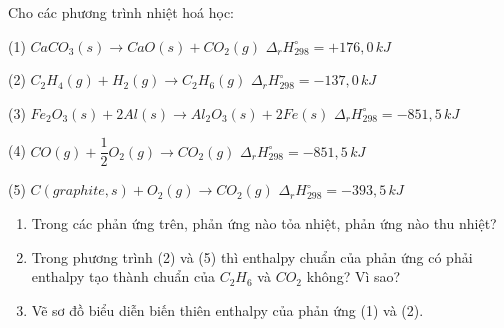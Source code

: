\documentclass[Main.tex]{subfiles}
\begin{document}
	\begin{bt}
		Cho các phương trình nhiệt hoá học:
		
		(1) $CaCO_3(s) \longrightarrow CaO(s) + CO_2(g)\,\, \Delta_r H_{298}^\circ = +176{,}0\, kJ$
		
		(2) $C_2H_4(g) + H_2(g) \longrightarrow C_2H_6(g)\,\, \Delta_r H_{298}^\circ = -137{,}0\, kJ$
		
		(3) $Fe_2O_3(s) + 2Al(s) \longrightarrow Al_2O_3(s) + 2Fe(s)\,\, \Delta_r H_{298}^\circ = -851{,}5\, kJ$
		
		(4) $CO(g) + \dfrac{1}{2}O_2(g) \longrightarrow CO_2(g)\,\, \Delta_r H_{298}^\circ = -851{,}5\, kJ$
		
		(5) $C(graphite, s) + O_2(g) \longrightarrow CO_2(g)\,\, \Delta_r H_{298}^\circ = -393{,}5\, kJ$
		
		\begin{enumerate}
			\item[(a)] Trong các phản ứng trên, phản ứng nào tỏa nhiệt, phản ứng nào thu nhiệt?
			\item[(b)] Trong phương trình (2) và (5) thì enthalpy chuẩn của phản ứng có phải enthalpy tạo thành chuẩn của $C_2H_6$ và $CO_2$ không? Vì sao?
			\item[(c)] Vẽ sơ đồ biểu diễn biến thiên enthalpy của phản ứng (1) và (2).
		\end{enumerate}
\end{bt}
\end{document}

